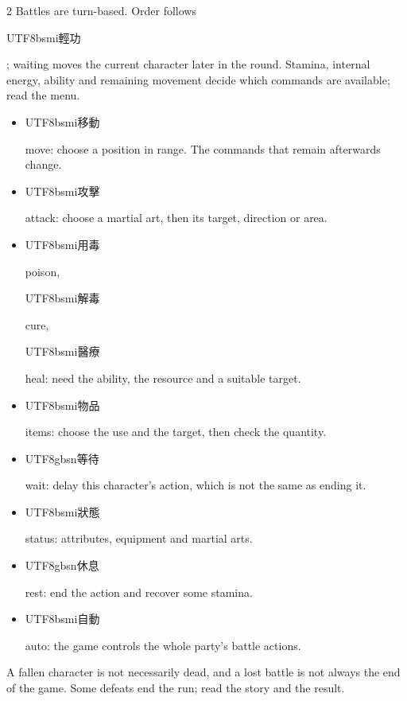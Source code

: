 \begin{paracol}{2}
Battles are turn-based. Order follows \begin{CJK}{UTF8}{bsmi}輕功\end{CJK}; waiting moves the current character later in the round. Stamina, internal energy, ability and remaining movement decide which commands are available; read the menu.\par
\begin{itemize}[leftmargin=*,topsep=1pt,itemsep=0pt,parsep=0pt]\item \begin{CJK}{UTF8}{bsmi}移動\end{CJK} move: choose a position in range. The commands that remain afterwards change.\item \begin{CJK}{UTF8}{bsmi}攻擊\end{CJK} attack: choose a martial art, then its target, direction or area.\item \begin{CJK}{UTF8}{bsmi}用毒\end{CJK} poison, \begin{CJK}{UTF8}{bsmi}解毒\end{CJK} cure, \begin{CJK}{UTF8}{bsmi}醫療\end{CJK} heal: need the ability, the resource and a suitable target.\item \begin{CJK}{UTF8}{bsmi}物品\end{CJK} items: choose the use and the target, then check the quantity.\item \begin{CJK}{UTF8}{gbsn}等待\end{CJK} wait: delay this character's action, which is not the same as ending it.\item \begin{CJK}{UTF8}{bsmi}狀態\end{CJK} status: attributes, equipment and martial arts.\item \begin{CJK}{UTF8}{gbsn}休息\end{CJK} rest: end the action and recover some stamina.\item \begin{CJK}{UTF8}{bsmi}自動\end{CJK} auto: the game controls the whole party's battle actions.\end{itemize}
A fallen character is not necessarily dead, and a lost battle is not always the end of the game. Some defeats end the run; read the story and the result.\par

\end{paracol}
